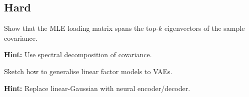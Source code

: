 \subsection*{Hard}

\begin{problem}
Show that the MLE loading matrix spans the top-$k$ eigenvectors of the sample covariance.

\textbf{Hint:} Use spectral decomposition of covariance.
\end{problem}

\begin{problem}
Sketch how to generalise linear factor models to VAEs.

\textbf{Hint:} Replace linear-Gaussian with neural encoder/decoder.
\end{problem}


